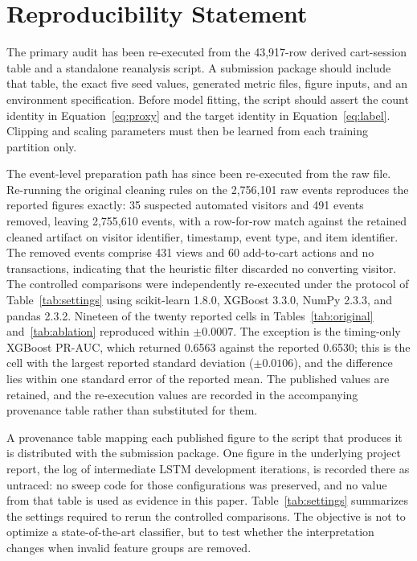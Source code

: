 \documentclass[conference, letterpaper]{IEEEtran}
\begin{document}
\section{Reproducibility Statement}
The primary audit has been re-executed from the 43,917-row derived cart-session table and a standalone reanalysis script. A submission package should include that table, the exact five seed values, generated metric files, figure inputs, and an environment specification. Before model fitting, the script should assert the count identity in Equation~\ref{eq:proxy} and the target identity in Equation~\ref{eq:label}. Clipping and scaling parameters must then be learned from each training partition only.

The event-level preparation path has since been re-executed from the raw file. Re-running the original cleaning rules on the 2,756,101 raw events reproduces the reported figures exactly: 35 suspected automated visitors and 491 events removed, leaving 2,755,610 events, with a row-for-row match against the retained cleaned artifact on visitor identifier, timestamp, event type, and item identifier. The removed events comprise 431 views and 60 add-to-cart actions and no transactions, indicating that the heuristic filter discarded no converting visitor. The controlled comparisons were independently re-executed under the protocol of Table~\ref{tab:settings} using scikit-learn 1.8.0, XGBoost 3.3.0, NumPy 2.3.3, and pandas 2.3.2. Nineteen of the twenty reported cells in Tables~\ref{tab:original} and~\ref{tab:ablation} reproduced within $\pm 0.0007$. The exception is the timing-only XGBoost PR-AUC, which returned 0.6563 against the reported 0.6530; this is the cell with the largest reported standard deviation ($\pm 0.0106$), and the difference lies within one standard error of the reported mean. The published values are retained, and the re-execution values are recorded in the accompanying provenance table rather than substituted for them.

A provenance table mapping each published figure to the script that produces it is distributed with the submission package. One figure in the underlying project report, the log of intermediate LSTM development iterations, is recorded there as untraced: no sweep code for those configurations was preserved, and no value from that table is used as evidence in this paper. Table~\ref{tab:settings} summarizes the settings required to rerun the controlled comparisons. The objective is not to optimize a state-of-the-art classifier, but to test whether the interpretation changes when invalid feature groups are removed.
\end{document}
